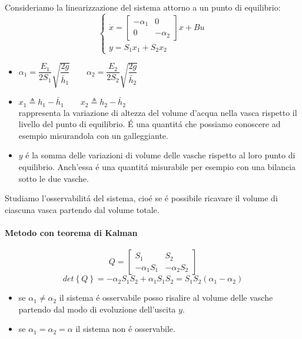 \documentclass[../main.tex]{subfiles}
\begin{document}
		\begin{mdframed}[style=Exercise]
			\begin{Exercise}[title={Studiare l'osservabilit\'a di due vasche in parallelo}]
				Consideriamo la linearizzazione del sistema attorno a un punto di equilibrio:
				\[
					\begin{cases}
						\dot x=
						\begin{bmatrix}
							-\alpha_1 & 0\\
							0 & -\alpha_2
						\end{bmatrix} x + Bu	
						\\
						y = S_1 x_1 + S_2 x_2
					\end{cases}
				\]
				\begin{itemize}
					\item 
						$ \alpha_1 = \dfrac{E_1}{2S_1} \sqrt{\dfrac{2g}{\overset{}{\bar h_1}}} \qquad \alpha_2 = \dfrac{E_2}{2S_2} \sqrt{\dfrac{2g}{\overset{}{\bar h_2}}} $ 
					\item 
						$ x_1 \triangleq h_1 - \bar h_1 \qquad x_2 \triangleq h_2 - \bar h_2 $\\
						rappresenta la variazione di altezza del volume d'acqua nella vasca rispetto il livello del punto di equilibrio. \'E una quantit\'a che possiamo conoscere ad esempio misurandola con un galleggiante.
					\item 
						$ y $ \'e la somma delle variazioni di volume delle vasche rispetto al loro punto di equilibrio. Anch'essa \'e una quantit\'a misurabile per esempio con una bilancia sotto le due vasche. 
				\end{itemize}
			
				Studiamo l'osservabilit\'a del sistema, cio\'e se \'e possibile ricavare il volume di ciascuna vasca partendo dal volume totale.
				
				\paragraph{Metodo con teorema di Kalman}
					\[
						Q =
						\begin{bmatrix}
							S_1 & S_2\\
							-\alpha_1 S_1 & -\alpha_2 S_2
						\end{bmatrix}
					\]
					\[
						det\left\lbrace Q \right\rbrace = -\alpha_2 S_1 S_2 + \alpha_1 S_1 S_2 = S_1 S_2 (\alpha_1 - \alpha_2)
					\]
					
					\begin{itemize}
						\item 
							se $ \alpha_1 \neq \alpha_2 $ il sistema \'e osservabile posso risalire al volume delle vasche partendo dal modo di evoluzione dell'uscita $ y $.
						\item 
							se $ \alpha_1 = \alpha_2 = \alpha $ il sistema non \'e osservabile.
					\end{itemize}
				

\end{Exercise}
\end{mdframed}
\end{document}
